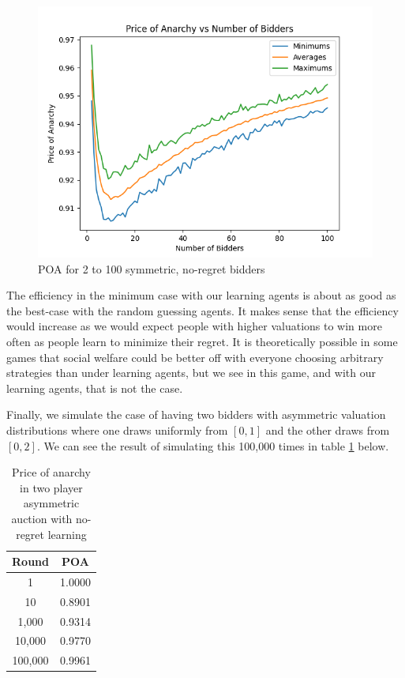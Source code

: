 \documentclass[12pt,twoside]{reedthesis}
\begin{document}
\begin{figure}[h!]
	\centering
	\includegraphics[scale=.8]{Figures/symmetric}
	\caption{POA for 2 to 100 symmetric, no-regret bidders}
	\label{figure:symmetric}
\end{figure}

The efficiency in the minimum case with our learning agents is about as good as the best-case with the random guessing agents. It makes sense that the efficiency would increase as we would expect people with higher valuations to win more often as people learn to minimize their regret. It is theoretically possible in some games that social welfare could be better off with everyone choosing arbitrary strategies than under learning agents, but we see in this game, and with our learning agents, that is not the case.  

Finally, we simulate the case of having two bidders with asymmetric valuation distributions where one draws uniformly from $[0,1]$ and the other draws from $[0,2]$. We can see the result of simulating this 100,000 times in table \ref{table:5} below.

\begin{table}[h!]
	\begin{center}
		\begin{tabular}{ |c|c| }
			\hline
			Round & POA \\
			\hline
			1 & 1.0000 \\
			10 & 0.8901 \\
			1,000 & 0.9314 \\
			10,000 & 0.9770 \\
			100,000 & 0.9961 \\
			\hline
		\end{tabular}
		\caption{Price of anarchy in two player asymmetric auction with no-regret learning}
		\label{table:5}
	\end{center} 
\end{table}
\end{document}
